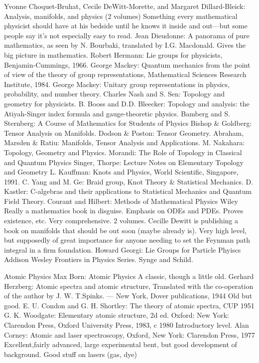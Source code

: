 \documentclass[10pt,a4paper]{book}
\theoremstyle{definition}
\begin{document}
Yvonne Choquet-Bruhat, Cecile DeWitt-Morette, and Margaret Dillard-Bleick: Analysis, manifolds, and physics (2 volumes)
Something every mathematical physicist should have at his bedside until he knows it inside and out—but some people say it's not especially easy to read.
Jean Dieudonne: A panorama of pure mathematics, as seen by N. Bourbaki, translated by I.G. Macdonald.
Gives the big picture in mathematics.
Robert Hermann: Lie groups for physicists, Benjamin-Cummings, 1966.
George Mackey: Quantum mechanics from the point of view of the theory of group representations, Mathematical Sciences Research Institute, 1984.
George Mackey: Unitary group representations in physics, probability, and number theory.
Charles Nash and S. Sen: Topology and geometry for physicists.
B. Booss and D.D. Bleecker: Topology and analysis: the Atiyah-Singer index formula and gauge-theoretic physics.
Bamberg and S. Sternberg: A Course of Mathematics for Students of Physics
Bishop \& Goldberg: Tensor Analysis on Manifolds.
Dodson \& Poston: Tensor Geometry.
Abraham, Marsden \& Ratiu: Manifolds, Tensor Analysis and Applications.
M. Nakahara: Topology, Geometry and Physics.
Morandi: The Role of Topology in Classical and Quantum Physics
Singer, Thorpe: Lecture Notes on Elementary Topology and Geometry
L. Kauffman: Knots and Physics, World Scientific, Singapore, 1991.
C. Yang and M. Ge: Braid group, Knot Theory \& Statistical Mechanics.
D. Kastler: C-algebras and their applications to Statistical Mechanics and Quantum Field Theory.
Courant and Hilbert: Methods of Mathematical Physics Wiley
Really a mathematics book in disguise.  Emphasis on ODEs and PDEs.  Proves existence, etc.  Very comprehensive.  2 volumes.
Cecille Dewitt is publishing a book on manifolds that should be out soon (maybe already is).  Very high level, but supposedly of great importance for anyone needing to set the Feynman path integral in a firm foundation.
Howard Georgi: Lie Groups for Particle Phyiscs Addison Wesley Frontiers in Physics Series.
Synge and Schild.



Atomic Physics
Max Born: Atomic Physics
A classic, though a little old.
Gerhard Herzberg: Atomic spectra and atomic structure, Translated with the co-operation of the author by J. W. T.Spinks. — New York, Dover publications, 1944
Old but good.
E. U. Condon and G. H. Shortley: The theory of atomic spectra, CUP 1951
G. K. Woodgate: Elementary atomic structure, 2d ed. Oxford: New York: Clarendon Press, Oxford University Press, 1983, c 1980
Introductory level.
Alan Corney: Atomic and laser spectroscopy, Oxford, New York: Clarendon Press, 1977
Excellent,fairly advanced, large experimental bent, but good development of background.  Good stuff on lasers (gas, dye)
\end{document}
